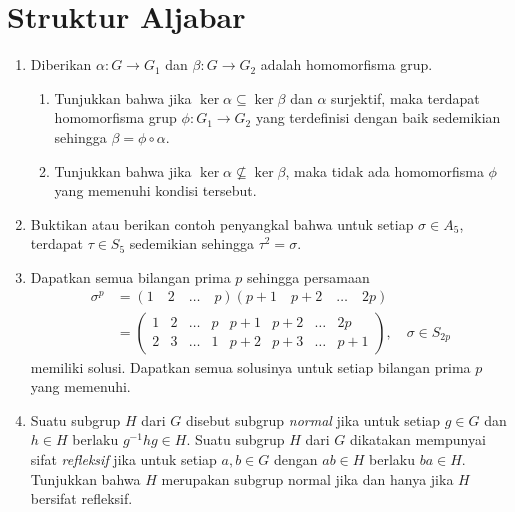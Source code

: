 \documentclass[11pt,a4paper]{article}
\begin{document}
\section*{Struktur Aljabar}
\begin{enumerate}[label=\arabic*., start=37]
  \setcounter{enumi}{0} %
  \item %
        Diberikan $\alpha : G \to G_1$ dan $\beta : G \to G_2$ adalah homomorfisma grup.
        \begin{enumerate}[label=(\alph*)]
          \item Tunjukkan bahwa jika $\ker \alpha \subseteq \ker \beta$ dan $\alpha$ surjektif, maka terdapat homomorfisma grup $\phi : G_1 \to G_2$ yang terdefinisi dengan baik sedemikian sehingga $\beta = \phi \circ \alpha$.
          \item Tunjukkan bahwa jika $\ker \alpha \not\subseteq \ker \beta$, maka tidak ada homomorfisma $\phi$ yang memenuhi kondisi tersebut.
        \end{enumerate}

  \item %
        Buktikan atau berikan contoh penyangkal bahwa untuk setiap $\sigma \in A_5$, terdapat $\tau \in S_5$ sedemikian sehingga $\tau^2 = \sigma$.

  \item
        Dapatkan semua bilangan prima $p$ sehingga persamaan
        \begin{align*}
          \sigma^p & = (1 \quad 2 \quad \dots \quad p)(p+1 \quad p+2 \quad \dots \quad 2p)                                                                              \\
                   & = \begin{pmatrix} 1 & 2 & \dots & p & p+1 & p+2 & \dots & 2p \\ 2 & 3 & \dots & 1 & p+2 & p+3 & \dots & p+1 \end{pmatrix}, \quad \sigma \in S_{2p}
        \end{align*}
        memiliki solusi. Dapatkan semua solusinya untuk setiap bilangan prima $p$ yang memenuhi.

  \item
        Suatu subgrup $H$ dari $G$ disebut subgrup \textit{normal} jika untuk setiap $g \in G$ dan $h \in H$ berlaku $g^{-1}hg \in H$. Suatu subgrup $H$ dari $G$ dikatakan mempunyai sifat \textit{refleksif} jika untuk setiap $a,b \in G$ dengan $ab \in H$ berlaku $ba \in H$. Tunjukkan bahwa $H$ merupakan subgrup normal jika dan hanya jika $H$ bersifat refleksif.


\end{enumerate}
\end{document}

